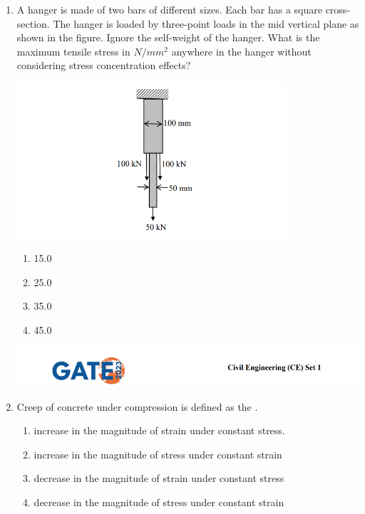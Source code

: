 \documentclass{exam}
\begin{document}
\begin{enumerate}
\item A hanger is made of two bars of different sizes. Each bar has a square cross-section. The hanger is loaded by three-point loads in the mid vertical plane as shown in the figure. Ignore the self-weight of the hanger. What is the maximum tensile stress in $N/mm^2$ anywhere in the hanger without considering stress concentration effects?

\includegraphics[width=10cm]{pics/Screenshot 2025-08-02 133214.png}
\begin{enumerate}
    \item 15.0
    \item 25.0
    \item 35.0
    \item 45.0
\end{enumerate}

\newpage

\includegraphics[width=\textwidth]{pics/header.png}
\item Creep of concrete under compression is defined as the \underline{\hspace{2cm}}.
\begin{enumerate}
    \item increase in the magnitude of strain under constant stress.
    \item increase in the magnitude of stress under constant strain
    \item decrease in the magnitude of strain under constant stress
    \item decrease in the magnitude of stress under constant strain
\end{enumerate}
\vspace{0.5cm}


\end{enumerate}
\end{document}

